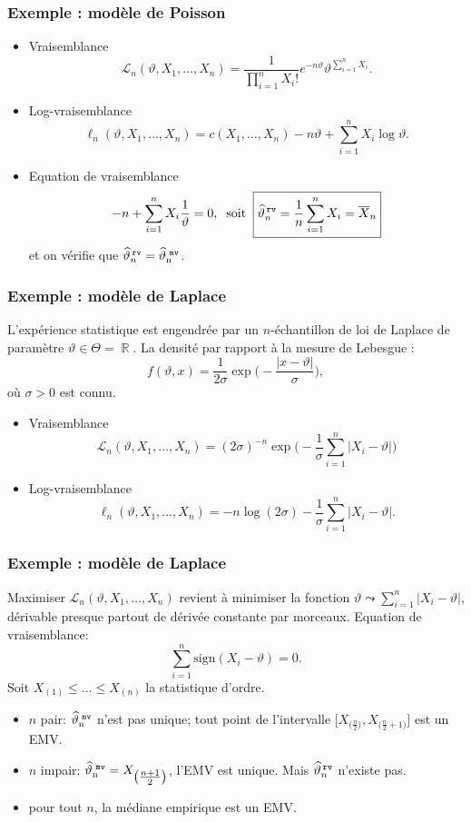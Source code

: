 ﻿\documentclass{beamer}
\DeclareMathOperator{\R}{{\mathbb R}}
\DeclareMathOperator{\estMV}{\widehat \vartheta_n^{\,\,{\tt mv}}}
\begin{document}
\begin{frame}
\frametitle{Exemple : modèle de Poisson}
\begin{itemize}
\item
{\color{red}Vraisemblance}
$${\mathcal L}_n(\vartheta, X_1,\ldots, X_n) =
\frac{1}{\prod_{i = 1}^n X_i!}e^{-n\vartheta}\vartheta^{\sum_{i = 1}^n X_i}.$$
\item {\color{red}Log-vraisemblance}
$$\ell_n(\vartheta, X_1,\ldots, X_n) = c(X_1,\ldots, X_n)-n\vartheta +\sum_{i =1}^n X_i \log \vartheta.$$
\item {\color{red}Equation de vraisemblance}
$$-n+\sum_{i = 1}^n X_i \frac{1}{\vartheta} = 0,\;\;
\text{soit}\;\;
\boxed{\widehat \vartheta_n^{\,{\tt rv}} = \frac{1}{n}\sum_{i = 1}^n X_i=\overline{X}_n}$$
et on vérifie que $\widehat \vartheta_n^{\,{\tt rv}} =\estMV$.
\end{itemize}
\end{frame}

\begin{frame}
\frametitle{Exemple : mod\`ele de Laplace} L'expérience statistique
est engendrée par un $n$-échantillon de loi de Laplace de paramètre
$\vartheta \in \Theta = \R$. La densité par rapport à la mesure de
Lebesgue :
$$f(\vartheta,x) = \frac{1}{2\sigma}\exp\big(-\frac{|x-\vartheta|}{\sigma}\big),$$
où $\sigma >0$ est {\color{red}connu}.
\begin{itemize}
\item {\color{red}Vraisemblance}
$${\mathcal L}_n(\vartheta, X_1,\ldots, X_n) = (2\sigma)^{-n}
\exp\big(-\frac{1}{\sigma}\sum_{i = 1}^n \big|X_i-\vartheta\big|\big)$$
\item {\color{red}Log-vraisemblance}
$$\ell_n(\vartheta,X_1,\ldots, X_n) = - n \log(2\sigma)-
\frac{1}{\sigma}\sum_{i = 1}^n \big|X_i-\vartheta\big|.$$
\end{itemize}
\end{frame}

\begin{frame}
\frametitle{Exemple : mod\`ele de Laplace} Maximiser ${\mathcal
L}_n(\vartheta, X_1,\ldots, X_n)$ revient à minimiser la fonction
$\vartheta \leadsto \sum_{i = 1}^n \big|X_i-\vartheta\big|$,
dérivable presque partout de dérivée constante par morceaux.
{\color{red}Equation de vraisemblance:}
$$\sum_{i = 1}^n \text{sign}(X_i-\vartheta)=0.$$
Soit $X_{(1)}\leq \ldots \leq X_{(n)}$ la statistique d'ordre.
\begin{itemize}
\item
$n$ pair: $\estMV$ {\color{red}n'est pas unique}; tout point de
l'intervalle
$\big[X_{\big(\tfrac{n}{2}\big)},X_{\big(\tfrac{n}{2}+1\big)} \big]$
est un EMV.
\item $n$ impair: $\estMV=X_{\big(\tfrac{n+1}{2}\big)}$,
l'EMV est unique. Mais $\widehat \vartheta_n^{\,{\tt rv}}$ n'existe
pas.
\item {\color{red}pour tout} $n$, la
médiane empirique est un EMV.
\end{itemize}
\end{frame}
\end{document}

